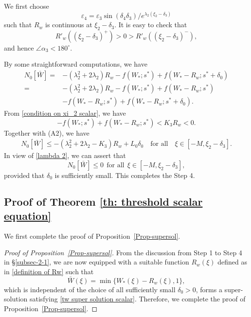 \documentclass[11pt,a4paper]{article}
\numberwithin{equation}{section}
\numberwithin{figure}{section}
\newcommand{\red}[1]{{\color{red}#1}}
\newcommand\beaa{\begin{eqnarray*}}
\newcommand\eeaa{\end{eqnarray*}}
\begin{document}
We first choose 
$$\varepsilon_4=\varepsilon_3\sin(\delta_4\delta_3)/e^{\lambda_2(\xi_2-\delta_3)}$$
such that $R_w$ is continuous at $\xi_2-\delta_3$. It is easy to check that 
$$R'_w((\xi_2-\delta_3)^+)>0>R'_w((\xi_2-\delta_3)^-),$$
 and hence $\angle\alpha_3< 180^{\circ}$.

By some  straightforward computations, we have
\begin{equation*}
\begin{aligned}
N_0[\bar W]=&-(\lambda_2^2+2\lambda_2)R_w-f(W_*;s^*)+f(W_*-R_w;s^*+\delta_0)\\
=&-(\lambda_2^2+2\lambda_2)R_w-f(W_*;s^*)+f(W_*-R_w;s^*)\\
&-f(W_*-R_w;s^*)+f(W_*-R_w;s^*+\delta_0).
\end{aligned}
\end{equation*}
From \eqref{condition on xi_2 scalar}, we have 
$$-f(W_*;s^*)+f(W_*-R_w;s^*)< K_3R_w<0.$$
Together with (A2), we have
\beaa
N_0[\bar W]\leq -(\lambda_2^2+2\lambda_2-K_3)R_w+L_0\delta_0\quad\text{for all}\quad \xi\in[-M,\xi_2-\delta_3].
\eeaa
In view of  \eqref{lambda 2},
we can assert that 
$$N_0[\bar W]\le 0\ \ \text{for all}\ \ \xi\in[-M,\xi_2-\delta_3],$$
 provided that $\delta_0$ is sufficiently small.
This completes the Step 4.


\subsection{Proof of Theorem \ref{th: threshold scalar equation}}

\noindent

We first complete the proof of Proposition~\ref{Prop-supersol}.
\begin{proof}[Proof of Proposition~\ref{Prop-supersol}]
From the discussion from Step 1 to Step 4 in \S \ref{subsec-2-1},
we are now equipped with a suitable function $R_w(\xi)$ %
defined as in \eqref{definition of Rw} such that 
$$\bar W (\xi)=\min \{W_*(\xi)-R_w(\xi),1\},$$
 which is independent of the choice of all sufficiently small $\delta_0>0$, forms
a super-solution satisfying \eqref{tw super solution scalar}.
Therefore, we complete the proof of Proposition~\ref{Prop-supersol}.
\end{proof}
\end{document}
